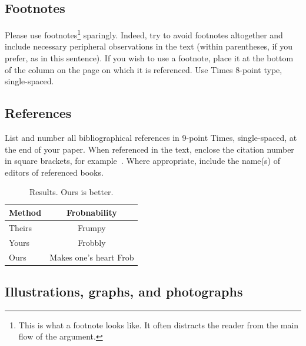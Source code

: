 \documentclass[10pt,twocolumn,letterpaper]{article}
\begin{document}
\begin{CJK}{UTF8}{bkai}
   \subsection{Footnotes}

   Please use footnotes\footnote {This is what a footnote looks like.  It
      often distracts the reader from the main flow of the argument.} sparingly.
   Indeed, try to avoid footnotes altogether and include necessary peripheral
   observations in
   the text (within parentheses, if you prefer, as in this sentence).  If you
   wish to use a footnote, place it at the bottom of the column on the page on
   which it is referenced. Use Times 8-point type, single-spaced.


   \subsection{References}

   List and number all bibliographical references in 9-point Times,
   single-spaced, at the end of your paper. When referenced in the text,
   enclose the citation number in square brackets, for
   example~\cite{Authors14}.  Where appropriate, include the name(s) of
   editors of referenced books.

   \begin{table}
      \begin{center}
         \begin{tabular}{|l|c|}
            \hline
            Method & Frobnability           \\
            \hline\hline
            Theirs & Frumpy                 \\
            Yours  & Frobbly                \\
            Ours   & Makes one's heart Frob \\
            \hline
         \end{tabular}
      \end{center}
      \caption{Results.   Ours is better.}
   \end{table}

   \subsection{Illustrations, graphs, and photographs}


\end{CJK}
\end{document}
